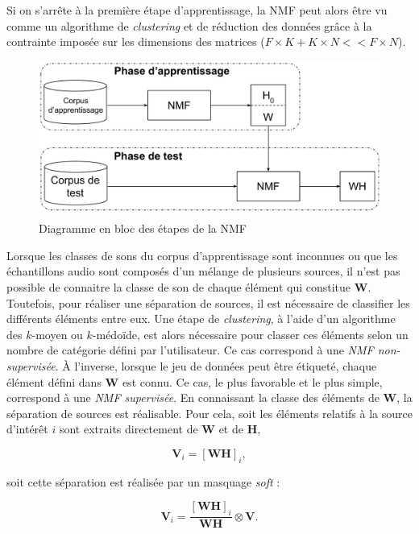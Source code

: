 Si on s'arrête à la première étape d'apprentissage, la NMF peut alors être vu comme un algorithme de \textit{clustering} \cite{li2006relationships} et de réduction des données grâce à la contrainte imposée sur les dimensions des matrices ($F \times K + K \times N << F \times N$).

\begin{figure}[ht]
\centering
\includegraphics[width=.8\linewidth]{./figures/NMF/NMF_apprentissage.pdf}
\caption{Diagramme en bloc des étapes de la NMF}
\label{fig:supervised_learning}
\end{figure}


Lorsque les classes de sons du corpus d'apprentissage sont inconnues ou que les échantillons audio sont composés d'un mélange de plusieurs sources, il n'est pas possible de connaitre la classe de son de chaque élément qui constitue $\mathbf{W}$. Toutefois, pour réaliser une séparation de sources, il est nécessaire de classifier les différents éléments entre eux. Une étape de \textit{clustering}, à l'aide d'un algorithme des $k$-moyen ou $k$-médoïde, est alors nécessaire pour classer ces éléments selon un nombre de catégorie défini par l'utilisateur. Ce cas correspond à une \textit{NMF non-supervisée}.
À l'inverse, lorsque le jeu de données peut être étiqueté, chaque élément défini dans $\mathbf{W}$ est connu. Ce cas, le plus favorable et le plus simple, correspond à une \textit{NMF supervisée}.
En connaissant la classe des éléments de $\mathbf{W}$, la séparation de sources est réalisable. Pour cela, soit les éléments relatifs à la source d'intérêt $i$ sont extraits directement de $\mathbf{W}$ et de $\mathbf{H}$,

\begin{equation}
\mathbf{V}_i = \left[\mathbf{WH}\right]_i,
\end{equation}

soit cette séparation est réalisée par un masquage \textit{soft} :

\begin{equation}
\mathbf{V}_i = \frac{\left[\mathbf{WH}\right]_i}{\mathbf{WH}} \otimes \mathbf{V}.
\end{equation}
\\

